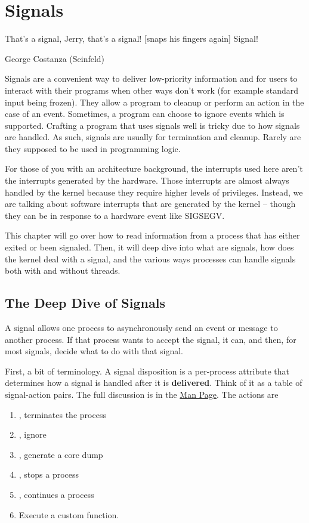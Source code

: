 \chapter{Signals}

\epigraph{That's a signal, Jerry, that's a signal! [snaps his fingers again] Signal!}{George Costanza (Seinfeld)}

Signals are a convenient way to deliver low-priority information and for users to interact with their programs when other ways don't work (for example standard input being frozen).
They allow a program to cleanup or perform an action in the case of an event.
Sometimes, a program can choose to ignore events which is supported.
Crafting a program that uses signals well is tricky due to how signals are handled.
As such, signals are usually for termination and cleanup.
Rarely are they supposed to be used in programming logic.

For those of you with an architecture background, the interrupts used here aren't the interrupts generated by the hardware.
Those interrupts are almost always handled by the kernel because they require higher levels of privileges.
Instead, we are talking about software interrupts that are generated by the kernel -- though they can be in response to a hardware event like SIGSEGV.

This chapter will go over how to read information from a process that has either exited or been signaled.
Then, it will deep dive into what are signals, how does the kernel deal with a signal, and the various ways processes can handle signals both with and without threads.

\section{The Deep Dive of Signals}

A signal allows one process to \gls{asynchronously} send an event or message to another process.
If that process wants to accept the signal, it can, and then, for most signals, decide what to do with that signal.

First, a bit of terminology.
A \gls{signal disposition} is a per-process attribute that determines how a signal is handled after it is \textbf{delivered}.
Think of it as a table of signal-action pairs.
The full discussion is in the \href{http://man7.org/linux/man-pages/man7/signal.7.html}{Man Page}.
The actions are
\begin{enumerate}
  \item {}, terminates the process
  \item {}, ignore
  \item {}, generate a core dump
  \item {}, stops a process
  \item {}, continues a process
  \item Execute a custom function.
\end{enumerate}

